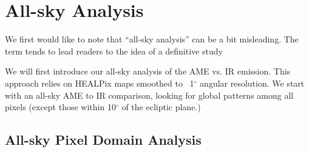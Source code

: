 \chapter{All-sky Analysis}
  \label{sec:analysis}

    We first would like to note that ``all-sky analysis'' can be a bit misleading. The term tends to lead readers to the idea of a definitive study

    We will first introduce our all-sky analysis of the AME vs. IR emission. This approach relies on HEALPix maps smoothed to  ~1$^{\circ}$ angular resolution. We start with an all-sky AME to IR comparison, looking for global patterns among all pixels (except those within 10$^{\circ}$ of the ecliptic plane.)

\section{All-sky Pixel Domain Analysis}
